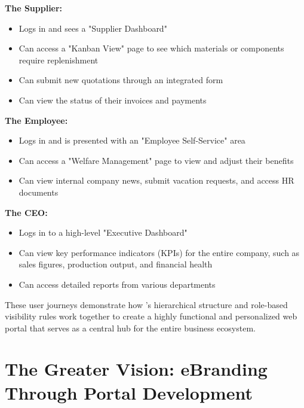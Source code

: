 \textbf{The Supplier:}
\begin{itemize}
	\item Logs in and sees a "Supplier Dashboard"
	\item Can access a "Kanban View" page to see which materials or components require replenishment
	\item Can submit new quotations through an integrated form
	\item Can view the status of their invoices and payments
\end{itemize}

\textbf{The Employee:}
\begin{itemize}
	\item Logs in and is presented with an "Employee Self-Service" area
	\item Can access a "Welfare Management" page to view and adjust their benefits
	\item Can view internal company news, submit vacation requests, and access HR documents
\end{itemize}

\textbf{The CEO:}
\begin{itemize}
	\item Logs in to a high-level "Executive Dashboard"
	\item Can view key performance indicators (KPIs) for the entire company, such as sales figures, production output, and financial health
	\item Can access detailed reports from various departments
\end{itemize}

These user journeys demonstrate how \wbdl{}'s hierarchical structure and role-based visibility rules work together to create a highly functional and personalized web portal that serves as a central hub for the entire business ecosystem.

\section{The Greater Vision: eBranding Through Portal Development}
\label{sec:ebranding-vision}

